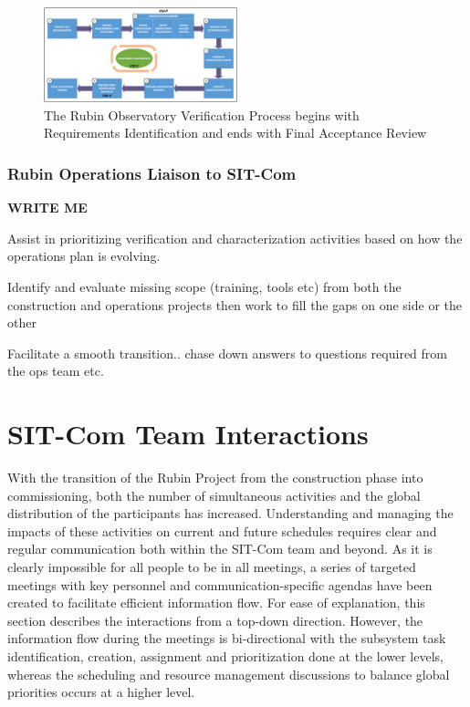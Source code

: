 \documentclass[SE,lsstdraft,authoryear,toc]{lsstdoc}
\begin{document}
\begin{figure}[h]
    \centering
    \includegraphics[width=0.5\textwidth]{static/verification_process}
    \caption{The Rubin Observatory Verification Process begins with Requirements Identification and ends with Final Acceptance Review}
    \label{fig:verification_process}
\end{figure}


\subsubsection{Rubin Operations Liaison to SIT-Com}

\textbf{WRITE ME}

Assist in prioritizing verification and characterization activities based on how the operations plan is evolving.

Identify and evaluate missing scope (training, tools etc) from both the construction and operations projects then work to fill the gaps on one side or the other

Facilitate a smooth transition.. chase down answers to questions required from the ops team etc.

\section{SIT-Com Team Interactions}
\label{sec:interactions}
With the transition of the Rubin Project from the construction phase into commissioning, both the number of simultaneous activities and the global distribution of the participants has increased.
Understanding and managing the impacts of these activities on current and future schedules requires clear and regular communication both within the SIT-Com team and beyond.
As it is clearly impossible for all people to be in all meetings, a series of targeted meetings with key personnel and communication-specific agendas have been created to facilitate efficient information flow.
For ease of explanation, this section describes the interactions from a top-down direction.
However, the information flow during the meetings is bi-directional with the subsystem task identification, creation, assignment and prioritization done at the lower levels, whereas the scheduling and resource management discussions to balance global priorities occurs at a higher level.
\end{document}

